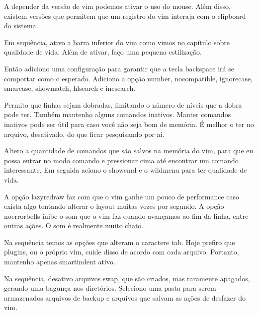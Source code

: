 
A depender da versão de vim podemos ativar o uso do mouse.
Além disso, existem versões que permitem que um registro do vim interaja com o clipboard do sistema.


Em sequência, ativo a barra inferior do vim como vimos no capítulo sobre qualidade de vida.
Além de ativar, faço uma pequena estilização.


Então adiciono uma configuração para garantir que a tecla backspace irá se comportar como o esperado.
Adiciono a opção number, nocompatible, ignorecase, smarcase, showmatch, hlsearch e incsearch.


Permito que linhas sejam dobradas, limitando o número de níveis que a dobra pode ter.
Também mantenho alguns comandos inativos.
Manter comandos inativos pode ser útil para caso você não seja bom de memória.
É melhor o ter no arquivo, desativado, do que ficar pesquisando por aí.


Altero a quantidade de comandos que são salvos na memória do vim, para que eu possa entrar no modo comando e pressionar cima até encontrar um comando interessante.
Em seguida aciono o showcmd e o wildmenu para ter qualidade de vida.

A opção lazyredraw faz com que o vim ganhe um pouco de performance caso exista algo tentando alterar o layout muitas vezes por segundo.
A opção noerrorbells inibe o som que o vim faz quando avançamos ao fim da linha, entre outras ações.
O som é realmente muito chato.


Na sequência temos as opções que alteram o caractere tab.
Hoje prefiro que plugins, ou o próprio vim, cuide disso de acordo com cada arquivo.
Portanto, mantenho apenas smartindent ativo.

Na sequência, desativo arquivos swap, que são criados, mas raramente apagados, gerando uma bagunça nos diretórios.
Seleciono uma pasta para serem armazenados arquivos de backup e arquivos que salvam as ações de desfazer do vim.

